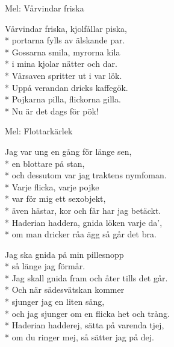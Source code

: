 \begin{SongText}[Pökvisa]
    \begin{SongInfo}
        Mel: Vårvindar friska
    \end{SongInfo}
    \begin{SongVerse}
        Vårvindar friska, kjolfållar piska,\\*%
        portarna fylls av älskande par.\\*%
        Gossarna smila, myrorna kila\\*%
        i mina kjolar nätter och dar.\\*%
        Vårsaven spritter ut i var lök.\\*%
        Uppå verandan dricks kaffegök.\\*%
        Pojkarna pilla, flickorna gilla.\\*%
        Nu är det dags för pök!
    \end{SongVerse}
\end{SongText}
\begin{SongText}[Blottarkärlek]
    \begin{SongInfo}
        Mel: Flottarkärlek
    \end{SongInfo}
    \begin{SongVerse}
        Jag var ung en gång för länge sen,\\*%
        en blottare på stan,\\*%
        och dessutom var jag traktens nymfoman.\\*%
        Varje flicka, varje pojke\\*%
        var för mig ett sexobjekt,\\*%
        även hästar, kor och får har jag betäckt.\\*%
        Haderian haddera, gnida löken varje da',\\*%
        om man dricker råa ägg så går det bra.
    \end{SongVerse}
    \begin{SongVerse}
        Jag ska gnida på min pillesnopp\\*%
        så länge jag förmår.\\*%
        Jag skall gnida fram och åter tills det går.\\*%
        Och när sädesvätskan kommer\\*%
        sjunger jag en liten sång,\\*%
        och jag sjunger om en flicka het och trång.\\*%
        Haderian hadderej, sätta på varenda tjej,\\*%
        om du ringer mej, så sätter jag på dej.
    \end{SongVerse}
\end{SongText}
